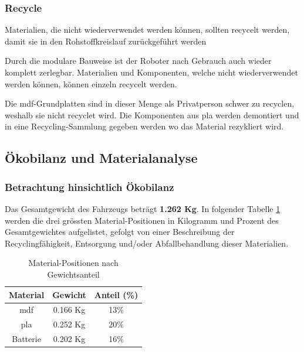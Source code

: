 \subsubsection{Recycle}

Materialien, die nicht wiederverwendet werden können, sollten
recycelt werden, damit sie in den Rohstoffkreislauf zurückgeführt werden

Durch die modulare Bauweise ist der Roboter nach Gebrauch auch wieder komplett zerlegbar. Materialien und Komponenten, welche nicht wiederverwendet werden können, können einzeln recycelt werden.

Die \acrshort{mdf}-Grundplatten sind in dieser Menge als Privatperson schwer zu recyclen, weshalb sie nicht recyclet wird. Die Komponenten aus \acrshort{pla} werden demontiert und in eine Recycling-Sammlung gegeben werden wo das Material rezykliert wird.

\subsection{Ökobilanz und Materialanalyse}

\subsubsection{Betrachtung hinsichtlich Ökobilanz}
Das Gesamtgewicht des Fahrzeugs beträgt \textbf{1.262 Kg}. In folgender Tabelle \ref{tab:kritische-mat} werden die drei grössten Material-Positionen in Kilogramm und Prozent des Gesamtgewichtes aufgelistet, gefolgt von einer Beschreibung der Recyclingfähigkeit, Entsorgung und/oder Abfallbehandlung dieser Materialien.

\begin{table}[h]
    \centering
    \begin{tabular}{c c c}
    \toprule
    Material & Gewicht  & Anteil (\%)\\
    \midrule
    \acrshort{mdf} & 0.166 Kg & 13\% \\
    \acrshort{pla} & 0.252 Kg & 20\% \\
    Batterie & 0.202 Kg & 16\%   \\
    \bottomrule
    \end{tabular}
    \caption{Material-Positionen nach Gewichtsanteil}
    \label{tab:kritische-mat}
\end{table}



